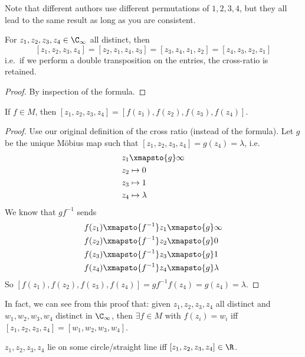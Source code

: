 \documentclass[a4paper]{article}
\begin{document}
Note that different authors use different permutations of $1, 2, 3, 4$, but they all lead to the same result as long as you are consistent.

\begin{lemma}
  For $z_1, z_2, z_3, z_4\in \C_\infty$ all distinct, then
  \[
    [z_1, z_2, z_3, z_4] = [z_2, z_1, z_4, z_3] = [z_3, z_4, z_1, z_2] = [z_4, z_3, z_2, z_1]
  \]
  i.e.\ if we perform a double transposition on the entries, the cross-ratio is retained.
\end{lemma}

\begin{proof}
  By inspection of the formula.
\end{proof}

\begin{prop}
  If $f\in M$, then $[z_1, z_2, z_3, z_4] = [f(z_1), f(z_2), f(z_3), f(z_4)]$.
\end{prop}

\begin{proof}
  Use our original definition of the cross ratio (instead of the formula). Let $g$ be the unique M\"obius map such that $[z_1, z_2, z_3, z_4] = g(z_4) = \lambda$, i.e.
  \begin{align*}
    z_1 &\xmapsto{g} \infty\\
    z_2 &\mapsto 0\\
    z_3 &\mapsto 1\\
    z_4 &\mapsto \lambda
  \end{align*}
  We know that $gf^{-1}$ sends
  \begin{align*}
    f(z_1)\xmapsto{f^{-1}} z_1 &\xmapsto{g} \infty\\
    f(z_2)\xmapsto{f^{-1}} z_2 &\xmapsto{g} 0\\
    f(z_3)\xmapsto{f^{-1}} z_3 &\xmapsto{g} 1\\
    f(z_4)\xmapsto{f^{-1}} z_4 &\xmapsto{g} \lambda
  \end{align*}
  So $[f(z_1), f(z_2), f(z_3), f(z_4)] = gf^{-1}f(z_4) = g(z_4) = \lambda$.
\end{proof}

In fact, we can see from this proof that: given $z_1, z_2, z_3, z_4$ all distinct and $w_1, w_2, w_3, w_4$ distinct in $\C_\infty$, then $\exists f\in M$ with $f(z_i) = w_i$ iff $[z_1, z_2, z_3, z_4] = [w_1, w_2, w_3, w_4]$.

\begin{cor}
  $z_1, z_2, z_3, z_4$ lie on some circle/straight line iff $[z_1, z_2, z_3, z_4]\in \R$.
\end{cor}
\end{document}
